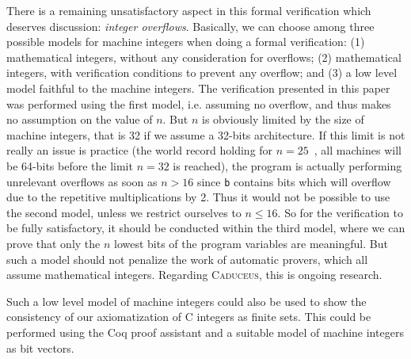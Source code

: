 \documentclass[a4paper]{llncs}
\newcommand{\caduceus}{\textsc{Caduceus}}
\begin{document}
There is a remaining unsatisfactory aspect in this formal verification
which deserves discussion: \emph{integer overflows}. Basically, we can
choose among three possible models for machine integers when doing a
formal verification: (1) mathematical integers, without any
consideration for overflows; (2) mathematical integers, with
verification conditions to prevent any overflow; and (3) a low level
model faithful to the machine integers. The verification presented in
this paper was performed using the first model, i.e. assuming no
overflow, and thus makes no assumption on the value of $n$. But 
$n$ is obviously limited by the size of machine integers, that is 32 if we
assume a 32-bits architecture. If this limit is not really an issue is
practice (the world record holding for $n=25$~\cite{nqueensrecord},
all machines will be 64-bits before the limit $n=32$ is reached), 
the program is actually performing unrelevant overflows as soon as
$n>16$ since \texttt{b} contains bits which will overflow
due to the repetitive multiplications by 2. Thus it would not be
possible to use the second model, unless we restrict ourselves to
$n\le 16$. So for the verification to be fully satisfactory, it should
be conducted within the third model, where we can prove that only the
$n$ lowest bits of the program variables are meaningful. But such a model
should not penalize the work of automatic provers, which all assume
mathematical integers. Regarding \caduceus, this is ongoing research.

Such a low level model of machine integers could also be used to
show the consistency of our axiomatization of C integers as finite sets.
This could be performed using the Coq proof assistant and a suitable
model of machine integers as bit vectors.


\nocite{*}



\appendix
\end{document}
